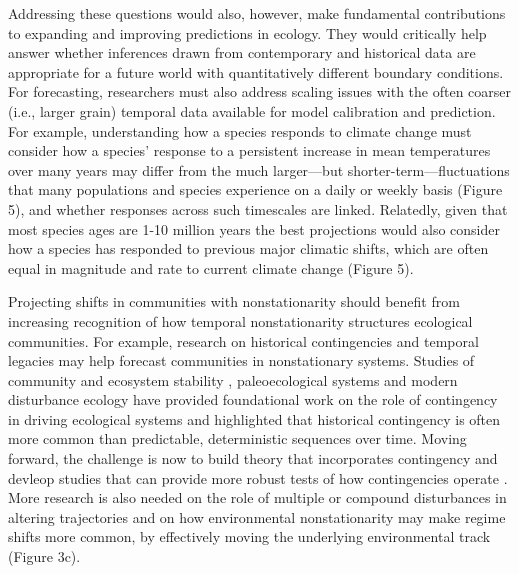 \documentclass[11pt,a4paper,oneside]{article}
\begin{document}
Addressing these questions would also, however, make fundamental contributions to expanding and improving predictions in ecology. They would critically help answer whether inferences drawn from contemporary and historical data are appropriate for a future world with quantitatively different boundary conditions. For forecasting, researchers must also address scaling issues with the often coarser (i.e., larger grain) temporal data available for model calibration and prediction. For example, understanding how a species responds to climate change must consider how a species' response to a persistent increase in mean temperatures over many years may differ from the much larger---but shorter-term---fluctuations that many populations and species experience on a daily or weekly basis (Figure 5), and whether responses across such timescales are linked. Relatedly, given that most species ages are 1-10 million years \citep{lawtonbook} the best projections would also consider how a species has responded to previous major climatic shifts, which are often equal in magnitude and rate to current climate change (Figure 5).

Projecting shifts in communities with nonstationarity should benefit from increasing recognition of how temporal nonstationarity structures ecological communities. For example, research on historical contingencies and temporal legacies may help forecast communities in nonstationary systems. Studies of community and ecosystem stability \citep{Boettiger2013}, paleoecological systems and modern disturbance ecology have provided foundational work on the role of contingency in driving ecological systems and highlighted that historical contingency is often more common than predictable, deterministic sequences over time. Moving forward, the challenge is now to build theory that incorporates contingency and devleop studies that can provide more robust tests of how contingencies operate \citep{vannette2014}. More research is also needed on the role of multiple or compound disturbances in altering trajectories and on how environmental nonstationarity may make regime shifts more common, by effectively moving the underlying environmental track (Figure 3c). %
\end{document}
